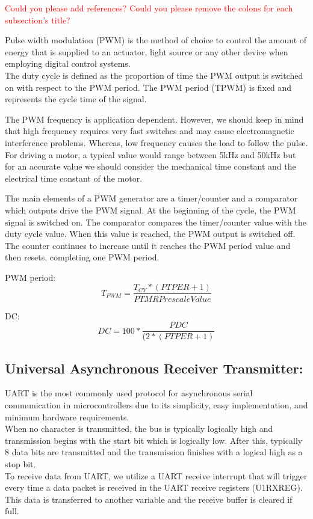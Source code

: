 \textcolor{red}{Could you please add references?}
\textcolor{red}{Could you please remove the colons for each subsection's title?}

Pulse width modulation (PWM) is the method of choice to control the amount of energy that is supplied to an actuator, light source or any other device when employing digital control systems.\\
The duty cycle is defined as the proportion of time the PWM output is switched on with respect to the PWM period.
The PWM period (TPWM) is fixed and represents the cycle time of the signal.

The PWM frequency is application dependent. However, we should keep in mind that high frequency requires very fast switches and may cause electromagnetic interference problems. Whereas, low frequency causes the load to follow the pulse.\\
For driving a motor, a typical value would range between 5kHz and 50kHz but for an accurate value we should consider the mechanical time constant and the electrical time constant of the motor.

The main elements of a PWM generator are a timer/counter and a comparator which outputs drive the PWM signal. At the beginning of the cycle, the PWM signal is switched on. The comparator compares the timer/counter value with the duty cycle value. When this value is reached, the PWM output is switched off. The counter continues to increase until it reaches the PWM period value and then resets, completing one PWM period.

PWM period:
$$T_{PWM}=\frac{T_{CY}*(PTPER+1)}{PTMR Prescale Value}$$

DC: 
$$DC=100* \frac{PDC}{(2*(PTPER+1)}$$


\subsection{Universal Asynchronous Receiver Transmitter:}

UART is the most commonly used protocol for asynchronous serial communication in microcontrollers due to its simplicity, easy implementation, and minimum hardware requirements.\\
When no character is transmitted, the bus is typically logically high and transmission begins with the start bit which is logically low. After this, typically 8 data bits are transmitted and the transmission finishes with a logical high as a stop bit.\\
To receive data from UART, we utilize a UART receive interrupt that will trigger every time a data packet is received in the UART receive registers (U1RXREG). This data is transferred to another variable and the receive buffer is cleared if full.

